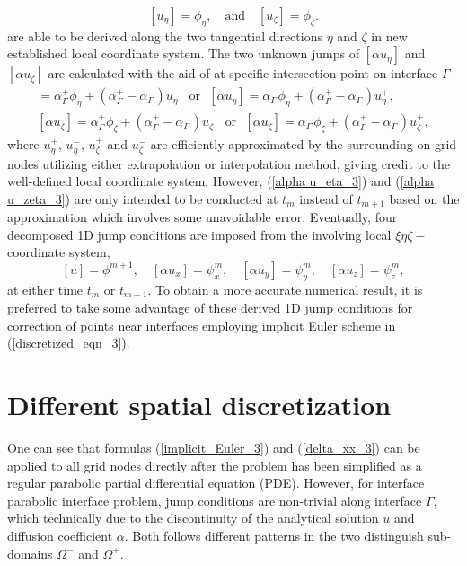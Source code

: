 \documentclass[dissertation]{uathesis}
\begin{document}
\begin{body}
\begin{flushleft}
%
\begin{equation}\label{jump_tan_3}
[u_{\eta}] = \phi_{\eta}, \quad \mbox{and} \quad [u_{\zeta}] = \phi_{\zeta}.
\end{equation}
%
are able to be derived along the two tangential directions $\eta$ and $\zeta$ in new established local coordinate system. The two unknown jumps of $[\alpha u_{\eta}]$ and $[\alpha u_{\zeta}]$ are calculated with the aid of at specific intersection point on interface $\Gamma$
%
\begin{align}
[\alpha u_{\eta}] = \alpha^{+}_{\Gamma}\phi_{\eta} + (\alpha_{\Gamma}^{+}-\alpha_{\Gamma}^{-})u^{-}_{\eta} ~~~ \mbox{or} ~~~ 
[\alpha u_{\eta}]  = \alpha_{\Gamma}^{-}\phi_{\eta} + 
(\alpha_{\Gamma}^{+}-\alpha_{\Gamma}^{-}) u^{+}_{\eta}, \label{alpha u_eta_3}    \\
[\alpha u_{\zeta}] = \alpha_{\Gamma}^{+}\phi_{\zeta} +
(\alpha_{\Gamma}^{+}-\alpha_{\Gamma}^{-}) u^{-}_{\zeta} ~~~ \mbox{or} ~~~ 
[\alpha u_{\zeta}] = \alpha_{\Gamma}^{-}\phi_{\zeta} + 
(\alpha_{\Gamma}^{+}-\alpha_{\Gamma}^{-}) u^{+}_{\zeta}, \label{alpha u_zeta_3}
\end{align}
%
where $u^{+}_{\eta}$, $u^{-}_{\eta}$, $u^{+}_{\zeta}$ and $u^{-}_{\zeta}$ are efficiently approximated by the surrounding on-grid nodes utilizing either extrapolation or interpolation method, giving credit to the well-defined local coordinate system. However, (\ref{alpha u_eta_3}) and (\ref{alpha u_zeta_3}) are only intended to be conducted at $t_m$ instead of $t_{m+1}$ based on the approximation which involves some unavoidable error. Eventually, four decomposed 1D jump conditions are imposed from the involving local $\xi\eta\zeta-$coordinate system, 
%
\begin{equation}\label{jump1D_3}
[u]=\phi^{m+1}, \quad [\alpha u_x]=\psi_x^m, \quad [\alpha u_y]=\psi_y^m, \quad [\alpha u_z]=\psi_z^m, 
\end{equation}
%
at either time $t_m$ or $t_{m+1}$. To obtain a more accurate numerical result, it is preferred to take some advantage of these derived 1D jump conditions for correction of points near interfaces employing implicit Euler scheme in (\ref{discretized_eqn_3}). 

\section{Different spatial discretization}
\hspace{1cm} One can see that formulas (\ref{implicit_Euler_3}) and (\ref{delta_xx_3}) can be applied to all grid nodes directly after the problem has been simplified as a regular parabolic partial differential equation (PDE). However, for interface parabolic interface problem, jump conditions are non-trivial along interface $\Gamma$, which technically due to the discontinuity of the analytical solution $u$ and diffusion coefficient $\alpha$. Both follows different patterns in the two distinguish sub-domains $\Omega^{-}$ and $\Omega^{+}$.


\end{flushleft}
\end{body}
\end{document}
